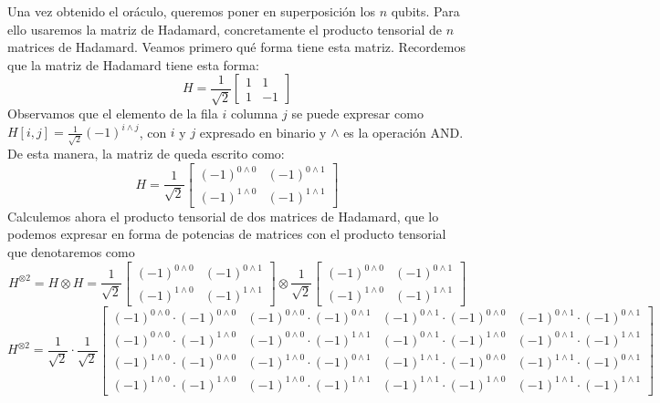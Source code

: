 \documentclass[a4paper]{article}
\numberwithin{equation}{section}
\begin{document}
Una vez obtenido el oráculo, queremos poner en superposición los $n$ qubits. Para ello usaremos la matriz de Hadamard, concretamente el producto tensorial de $n$ matrices de Hadamard. Veamos primero qué forma tiene esta matriz. Recordemos que la matriz de Hadamard tiene esta forma:
\begin{equation}
H = \frac{1}{\sqrt{2}}
\begin{bmatrix}
1 & 1 \\
1 & -1
\end{bmatrix}
\end{equation}\linebreak
Observamos que el elemento de la fila $i$ columna $j$ se puede expresar como $H[i, j] = \frac{1}{\sqrt{2}}(-1)^{i\wedge j}$, con $i$ y $j$ expresado en binario y $\wedge$ es la operación AND. De esta manera, la matriz de queda escrito como:
\begin{equation}
H = \frac{1}{\sqrt{2}}
\begin{bmatrix}
(-1)^{0\wedge 0} & (-1)^{0\wedge 1} \\
(-1)^{1\wedge 0} & (-1)^{1\wedge 1}
\end{bmatrix}
\end{equation}
Calculemos ahora el producto tensorial de dos matrices de Hadamard, que lo podemos expresar en forma de potencias de matrices con el producto tensorial que denotaremos como
\begin{equation}
H^{\otimes 2} = H\otimes H =
\frac{1}{\sqrt{2}}
\begin{bmatrix}
(-1)^{0\wedge 0} & (-1)^{0\wedge 1} \\
(-1)^{1\wedge 0} & (-1)^{1\wedge 1}
\end{bmatrix}\otimes
\frac{1}{\sqrt{2}}
\begin{bmatrix}
(-1)^{0\wedge 0} & (-1)^{0\wedge 1} \\
(-1)^{1\wedge 0} & (-1)^{1\wedge 1}
\end{bmatrix}
\end{equation}
\newpage
\begin{equation}
H^{\otimes 2} =
\frac{1}{\sqrt{2}} \cdot \frac{1}{\sqrt{2}}
\begin{bmatrix}
(-1)^{0\wedge 0}\cdot(-1)^{0\wedge 0} & (-1)^{0\wedge 0}\cdot(-1)^{0\wedge 1} & (-1)^{0\wedge 1}\cdot(-1)^{0\wedge 0} & (-1)^{0\wedge 1}\cdot(-1)^{0\wedge 1} 
\\
(-1)^{0\wedge 0}\cdot(-1)^{1\wedge 0} & (-1)^{0\wedge 0}\cdot(-1)^{1\wedge 1} & (-1)^{0\wedge 1}\cdot(-1)^{1\wedge 0} & (-1)^{0\wedge 1}\cdot(-1)^{1\wedge 1} 
\\
(-1)^{1\wedge 0}\cdot(-1)^{0\wedge 0} & (-1)^{1\wedge 0}\cdot(-1)^{0\wedge 1} & (-1)^{1\wedge 1}\cdot(-1)^{0\wedge 0} & (-1)^{1\wedge 1}\cdot(-1)^{0\wedge 1} 
\\
(-1)^{1\wedge 0}\cdot(-1)^{1\wedge 0} & (-1)^{1\wedge 0}\cdot(-1)^{1\wedge 1} & (-1)^{1\wedge 1}\cdot(-1)^{1\wedge 0} & (-1)^{1\wedge 1}\cdot(-1)^{1\wedge 1}
\end{bmatrix}
\end{equation}
\end{document}
